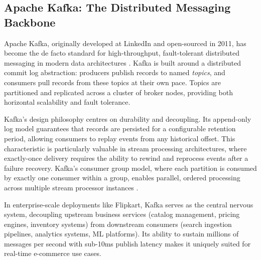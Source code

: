 \subsection{Apache Kafka: The Distributed Messaging Backbone}
\begin{justify}
    Apache Kafka, originally developed at LinkedIn and open-sourced in 2011, has become the de facto standard for high-throughput, fault-tolerant distributed messaging in modern data architectures \cite{[5]}. Kafka is built around a distributed commit log abstraction: producers publish records to named \textit{topics}, and consumers pull records from these topics at their own pace. Topics are partitioned and replicated across a cluster of broker nodes, providing both horizontal scalability and fault tolerance.

    Kafka's design philosophy centres on durability and decoupling. Its append-only log model guarantees that records are persisted for a configurable retention period, allowing consumers to replay events from any historical offset. This characteristic is particularly valuable in stream processing architectures, where exactly-once delivery requires the ability to rewind and reprocess events after a failure recovery. Kafka's consumer group model, where each partition is consumed by exactly one consumer within a group, enables parallel, ordered processing across multiple stream processor instances \cite{[6]}.

    In enterprise-scale deployments like Flipkart, Kafka serves as the central nervous system, decoupling upstream business services (catalog management, pricing engines, inventory systems) from downstream consumers (search ingestion pipelines, analytics systems, ML platforms). Its ability to sustain millions of messages per second with sub-10ms publish latency makes it uniquely suited for real-time e-commerce use cases.
\end{justify}

\vspace{0.25cm}


